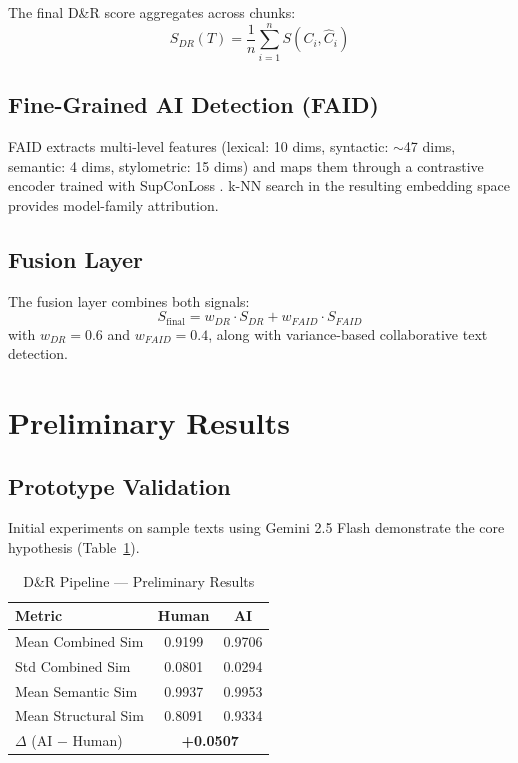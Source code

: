 \documentclass[conference]{IEEEtran}
\begin{document}
The final D\&R score aggregates across chunks:
\begin{equation}
    S_{DR}(T) = \frac{1}{n} \sum_{i=1}^{n} S(C_i, \hat{C}_i)
\end{equation}

\subsection{Fine-Grained AI Detection (FAID)}

FAID extracts multi-level features (lexical: 10 dims, syntactic:
$\sim$47 dims, semantic: 4 dims, stylometric: 15 dims) and maps them
through a contrastive encoder trained with SupConLoss
\cite{khosla2020}. k-NN search in the resulting embedding space
provides model-family attribution.

\subsection{Fusion Layer}

The fusion layer combines both signals:
\begin{equation}
    S_{\text{final}} = w_{DR} \cdot S_{DR} + w_{FAID} \cdot S_{FAID}
\end{equation}
with $w_{DR} = 0.6$ and $w_{FAID} = 0.4$, along with variance-based
collaborative text detection.

\section{Preliminary Results}

\subsection{Prototype Validation}

Initial experiments on sample texts using Gemini 2.5 Flash demonstrate
the core hypothesis (Table~\ref{tab:results}).

\begin{table}[h]
    \centering
    \caption{D\&R Pipeline — Preliminary Results}
    \label{tab:results}
    \begin{tabular}{lcc}
        \toprule
        \textbf{Metric} & \textbf{Human} & \textbf{AI} \\
        \midrule
        Mean Combined Sim & 0.9199 & 0.9706 \\
        Std Combined Sim & 0.0801 & 0.0294 \\
        Mean Semantic Sim & 0.9937 & 0.9953 \\
        Mean Structural Sim & 0.8091 & 0.9334 \\
        \midrule
        $\Delta$ (AI $-$ Human) & \multicolumn{2}{c}{\textbf{+0.0507}} \\
        \bottomrule
    \end{tabular}
\end{table}
\end{document}
